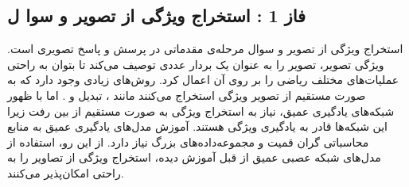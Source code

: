 \subsection{فاز 1 : استخراج ویژگی از تصویر و سوا ل} \label{sec:extract}

		استخراج ویژگی از تصویر و سوال مرحله‌ی مقدماتی در پرسش و پاسخ تصویری است. ویژگی تصویر، تصویر را به عنوان یک بردار عددی  توصیف می‌کند تا بتوان به راحتی عملیات‌های مختلف ریاضی را بر روی آن اعمال کرد. روش‌های زیادی وجود دارد که به صورت مستقیم از تصویر ویژگی استخراج می‌کنند مانند 
		، تبدیل
		و 
		.
		اما با ظهور شبکه‌های یادگیری عمیق، نیاز به استخراج ویژگی به صورت مستقیم از بین رفت زیرا این شبکه‌ها قادر به یادگیری ویژگی هستند. آموزش مدل‌های یادگیری عمیق به منابع محاسباتی گران قمیت و مجموعه‌داده‌های بزرگ نیاز دارد. از این رو، استفاده از مدل‌های شبکه عصبی عمیق از قبل آموزش دیده، استخراج ویژگی‌ از تصاویر را به راحتی امکان‌پذیر می‌کنند. 
		
